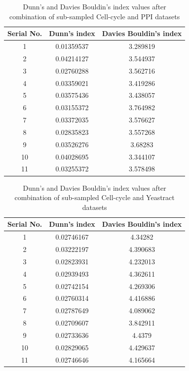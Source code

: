 \begin{table}
\centering
\begin{tabular}{|c|c|c|}
\hline
Serial No. & Dunn’s index  & Davies Bouldin’s index\\
\hline
1 & 0.01359537 & 3.289819 \\
2 & 0.04214127 & 3.544937 \\
3 & 0.02760288 & 3.562716 \\
4 & 0.03359021 & 3.419286 \\
5 & 0.03575436 & 3.438057 \\
6 & 0.03155372 & 3.764982 \\
7 & 0.03372035 & 3.576627 \\
8 & 0.02835823 & 3.557268 \\
9 & 0.03526276 & 3.68283 \\
10 & 0.04028695 & 3.344107 \\
11 & 0.03255372 & 3.578498 \\
\hline 
\end{tabular}
\caption{Dunn's and Davies Bouldin's index values after combination of sub-sampled Cell-cycle and PPI datasets}
\label{tab:ccycle_ppi_perturbed}
\end{table}

\begin{table}
\centering
\begin{tabular}{|c|c|c|}
\hline
Serial No. & Dunn’s index  & Davies Bouldin’s index\\
\hline
1 & 0.02746167 & 4.34282 \\
2 & 0.03222197 & 4.390683 \\
3 & 0.02823931 &  4.232013 \\
4 & 0.02939493 &  4.362611 \\
5 & 0.02742154 & 4.269306 \\
6 & 0.02760314 & 4.416886 \\
7 & 0.02787649 & 4.089062 \\
8 & 0.02709607 & 3.842911 \\
9 & 0.02733636 & 4.4379 \\
10 & 0.02829065 & 4.429637 \\
11 & 0.02746646 &  4.165664 \\
\hline 
\end{tabular}
\caption{Dunn's and Davies Bouldin's index values after combination of sub-sampled Cell-cycle and Yeastract datasets}
\label{tab:ccycle_yt_perturbed}
\end{table}

